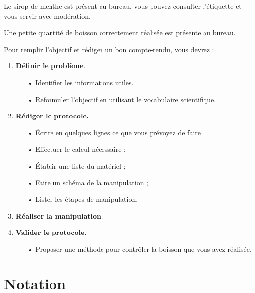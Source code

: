 Le sirop de menthe est présent au bureau, vous pouvez consulter l'étiquette et vous servir avec modération.

Une petite quantité de boisson correctement réalisée est présente au bureau.

Pour remplir l'objectif et rédiger un bon compte-rendu, vous devrez :
\begin{enumerate}
\item \textbf{Définir le problème}.
\begin{itemize}
\item[•] Identifier les informations utiles.
\item[•] Reformuler l'objectif en utilisant le vocabulaire scientifique.
\end{itemize}
\item \textbf{Rédiger le protocole.}
\begin{itemize}
\item[•] Écrire en quelques lignes ce que vous prévoyez de faire ;
\item[•] Effectuer le calcul nécessaire ;
\item[•] Établir une liste du matériel ;
\item[•] Faire un schéma de la manipulation ;
\item[•] Lister les étapes de manipulation.
\end{itemize}
\item \textbf{Réaliser la manipulation.}
\item \textbf{Valider le protocole.}
\begin{itemize}
\item[•] Proposer une méthode pour contrôler la boisson que vous avez réalisée.
\end{itemize}
\end{enumerate}

\section*{Notation}

